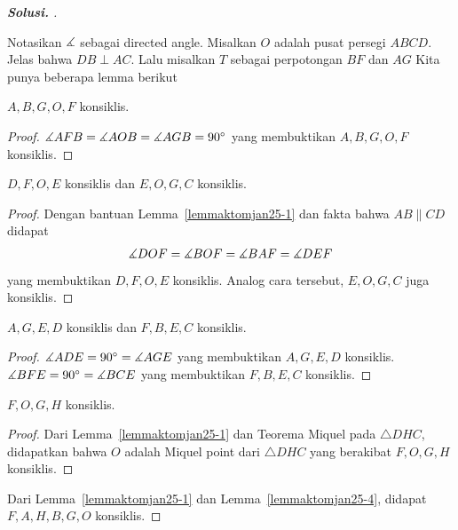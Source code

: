 \documentclass[letterpaper, 13pt]{scrartcl}
\begin{document}
\begin{proof}[\textbf{Solusi. }]
\begin{center}
\begin{tikzpicture}[scale=5, dot/.style={circle, fill, inner sep=0.5pt, outer sep=0pt}]
    \end{tikzpicture}
\end{center}

    Notasikan $\measuredangle$ sebagai directed angle.
    Misalkan $O$ adalah pusat persegi $ABCD$. Jelas bahwa $DB \perp AC$. Lalu misalkan $T$ sebagai perpotongan $BF$ dan $AG$ Kita punya beberapa lemma berikut
    \begin{lemmarev}\label{lemmaktomjan25-1}
        $A,B,G,O,F$ konsiklis.
        \begin{proof}
            $\measuredangle AFB = \measuredangle AOB = \measuredangle AGB = 90^\circ$ yang membuktikan $A,B,G,O,F$ konsiklis.
        \end{proof}
    \end{lemmarev}
    \begin{lemmarev}\label{lemmaktomjan25-2}
        $D,F,O,E$ konsiklis dan $E, O, G, C$ konsiklis.
        \begin{proof}
            Dengan bantuan Lemma~\ref{lemmaktomjan25-1} dan fakta bahwa $AB \parallel CD$ didapat
            \begin{align*}
                \measuredangle DOF = \measuredangle BOF = \measuredangle BAF = \measuredangle DEF
            \end{align*}
            yang membuktikan $D,F,O,E$ konsiklis. Analog cara tersebut, $E, O, G, C$ juga konsiklis.
        \end{proof}
    \end{lemmarev}
    \begin{lemmarev}\label{lemmaktomjan25-3}
        $A,G,E,D$ konsiklis dan $F,B,E,C$ konsiklis.
        \begin{proof}
            $\measuredangle ADE = 90^\circ = \measuredangle AGE$ yang membuktikan $A,G,E,D$ konsiklis. $\measuredangle BFE = 90^\circ = \measuredangle BCE$ yang membuktikan $F,B,E,C$ konsiklis.
        \end{proof}
    \end{lemmarev}
    \begin{lemmarev}\label{lemmaktomjan25-4}
        $F,O,G,H$ konsiklis.
        \begin{proof}
            Dari Lemma~\ref{lemmaktomjan25-1} dan Teorema Miquel pada $\triangle DHC$, didapatkan bahwa $O$ adalah Miquel point dari $\triangle DHC$ yang berakibat $F,O,G,H$ konsiklis.
        \end{proof}
    \end{lemmarev}
    Dari Lemma~\ref{lemmaktomjan25-1} dan Lemma~\ref{lemmaktomjan25-4}, didapat $F,A,H,B,G,O$ konsiklis.


\end{proof}
\end{document}
